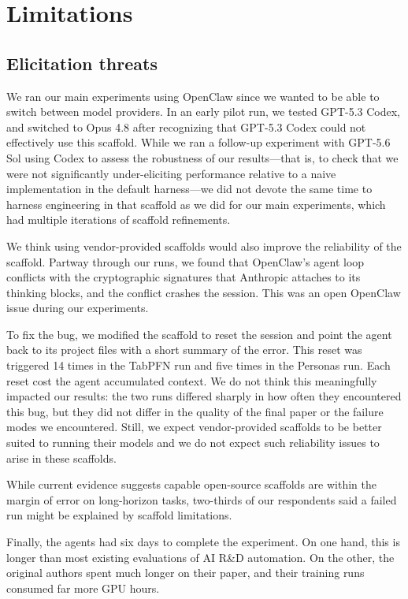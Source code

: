 \section{Limitations}
\label{sec:limitations}

\subsection{Elicitation threats}

We ran our main experiments using OpenClaw since we wanted to be able to switch
between model providers. In an early pilot run, we tested GPT-5.3 Codex, and
switched to Opus 4.8 after recognizing that GPT-5.3 Codex could not effectively
use this scaffold. While we ran a follow-up experiment with GPT-5.6 Sol using
Codex to assess the robustness of our results---that is, to check that we were not
significantly under-eliciting performance relative to a naive implementation
in the default harness---we did not devote the same time to harness engineering
in that scaffold as we did for our main experiments, which had multiple
iterations of scaffold refinements.

We think using vendor-provided scaffolds would also improve the reliability of
the scaffold. Partway through our runs, we found that OpenClaw's agent loop
conflicts with the cryptographic signatures that Anthropic attaches to its
thinking blocks, and the conflict crashes the session. This was an open
OpenClaw issue during our experiments.

To fix the bug, we modified the scaffold to reset the session and point the
agent back to its project files with a short summary of the error. This reset
was triggered 14 times in the TabPFN run and five times in the Personas run.
Each reset cost the agent accumulated context. We do not think this
meaningfully impacted our results: the two runs differed sharply in how often
they encountered this bug, but they did not differ in the quality of the final
paper or the failure modes we encountered. Still, we expect vendor-provided
scaffolds to be better suited to running their models and we do not expect such
reliability issues to arise in these scaffolds.

While current evidence suggests capable open-source scaffolds are within the
margin of error on long-horizon tasks, two-thirds of our respondents said a
failed run might be explained by scaffold limitations.

Finally, the agents had six days to complete the experiment. On one hand, this
is longer than most existing evaluations of AI R\&D automation. On the other,
the original authors spent much longer on their paper, and their training runs
consumed far more GPU hours.

